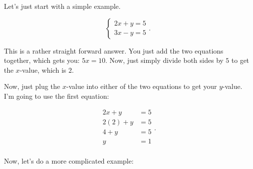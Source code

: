 \label{les_2_unit_2:solve_system_of_equations}

Let's just start with a simple example.

\begin{example}
  \label{exm:simple_example_by_solving_a_system_of_equations}

  \begin{equation}
    \label{cse:simple_example_by_solving_a_system_of_equations}
    \begin{cases}
      2x + y = 5 \\
      3x - y = 5
    \end{cases}
  .\end{equation}

  This is a rather straight forward answer. You just add the two equations
  together, which gets you: $5x = 10$. Now, just simply divide both sides by $5$ 
  to get the $x$-value, which is $2$.

  Now, just plug the $x$-value into either of the two equations to get your
  $y$-value. I'm going to use the first equation:

  \begin{equation}
    \label{eqt:first_equation_to_get_the_y_value}
    \begin{split}
      2x + y &= 5 \\
      2(2) + y &= 5 \\
      4 + y &= 5 \\
      y &= 1 \\
    \end{split}
  .\end{equation}
\end{example}

Now, let's do a more complicated example:

